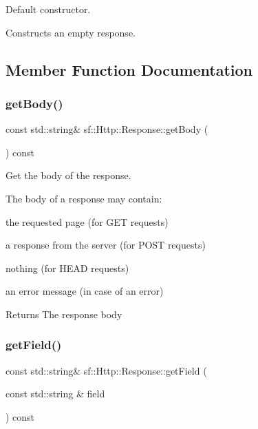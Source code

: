 Default constructor. 

Constructs an empty response. \begin{DoxyVerb}\end{DoxyVerb}
 

\subsection{Member Function Documentation}
\mbox{\label{classsf_1_1_http_1_1_response_ab3bfc29867563aa815f6460eeea16136}} 
\subsubsection{\texorpdfstring{getBody()}{getBody()}}
{\footnotesize\ttfamily const std\+::string\& sf\+::\+Http\+::\+Response\+::get\+Body (\begin{DoxyParamCaption}{ }\end{DoxyParamCaption}) const}



Get the body of the response. 

The body of a response may contain\+: \begin{DoxyItemize}
\item the requested page (for G\+ET requests) \item a response from the server (for P\+O\+ST requests) \item nothing (for H\+E\+AD requests) \item an error message (in case of an error)\end{DoxyItemize}
\begin{DoxyReturn}{Returns}
The response body \begin{DoxyVerb}\end{DoxyVerb}
 
\end{DoxyReturn}
\mbox{\label{classsf_1_1_http_1_1_response_a6dedeaeea13b5ebf0c41fc7a1c1885e5}} 
\subsubsection{\texorpdfstring{getField()}{getField()}}
{\footnotesize\ttfamily const std\+::string\& sf\+::\+Http\+::\+Response\+::get\+Field (\begin{DoxyParamCaption}\item[{const std\+::string \&}]{field }\end{DoxyParamCaption}) const}



